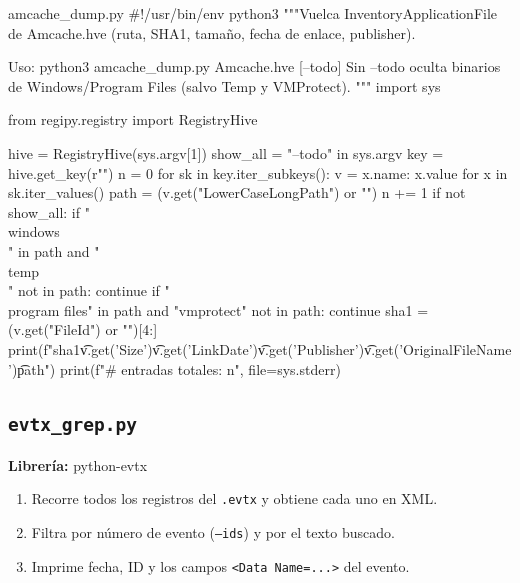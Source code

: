 \documentclass[11pt,a4paper]{article}
\begin{document}
\begin{codigopython}{amcache\_dump.py}
#!/usr/bin/env python3
"""Vuelca InventoryApplicationFile de Amcache.hve (ruta, SHA1, tamaño, fecha de enlace, publisher).

Uso: python3 amcache_dump.py Amcache.hve [--todo]
Sin --todo oculta binarios de Windows/Program Files (salvo Temp y VMProtect).
"""
import sys

from regipy.registry import RegistryHive

hive = RegistryHive(sys.argv[1])
show_all = "--todo" in sys.argv
key = hive.get_key(r"\Root\InventoryApplicationFile")
n = 0
for sk in key.iter_subkeys():
    v = {x.name: x.value for x in sk.iter_values()}
    path = (v.get("LowerCaseLongPath") or "")
    n += 1
    if not show_all:
        if "\\windows\\" in path and "\\temp\\" not in path:
            continue
        if "\\program files" in path and "vmprotect" not in path:
            continue
    sha1 = (v.get("FileId") or "")[4:]
    print(f"{sha1}\t{v.get('Size')}\t{v.get('LinkDate')}\t{v.get('Publisher')}\t{v.get('OriginalFileName')}\t{path}")
print(f"# entradas totales: {n}", file=sys.stderr)
\end{codigopython}

\subsection{\texttt{evtx\_grep.py}}
\textbf{Librería:} python-evtx
\begin{enumerate}

\item Recorre todos los registros del \texttt{.evtx} y obtiene cada uno en XML.

\item Filtra por número de evento (\texttt{--ids}) y por el texto buscado.

\item Imprime fecha, ID y los campos \texttt{<Data Name=...>} del evento.

\end{enumerate}
\end{document}
